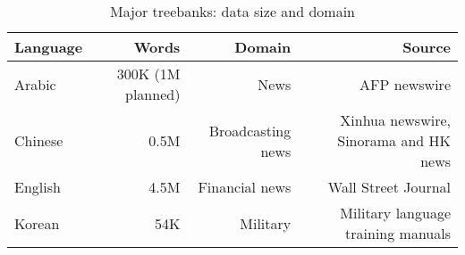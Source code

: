 \begin{table}
  \begin{tabular}{l|rrr}
                \hline
                Language & Words &  Domain & Source \\ \hline
                Arabic &  300K (1M planned)  &  News  & AFP newswire \\
                Chinese & 0.5M & Broadcasting news & Xinhua newswire, Sinorama and HK news \\
                English & 4.5M& Financial news & Wall Street Journal \\
                Korean & 54K  & Military & Military language training manuals \\ \hline
  \end{tabular}
  \caption{Major treebanks: data size and domain \label{table_treebanks_size}}
\end{table}
